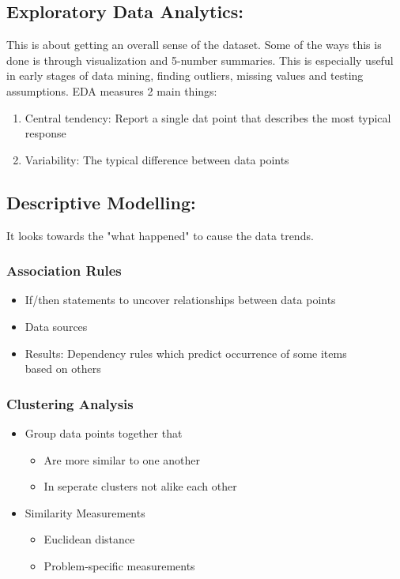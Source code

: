 \documentclass[a5paper]{article}
\begin{document}
	\subsection{Exploratory Data Analytics:}
	This is about getting an overall sense of the dataset. Some of the ways this is done is through visualization and 5-number summaries. This is especially useful in early stages of data mining, finding outliers, missing values and testing assumptions. EDA measures 2 main things:
	\begin{enumerate}
		\item Central tendency: Report a single dat point that describes the most typical response
		\item Variability: The typical difference between data points
	\end{enumerate}
	\subsection{Descriptive Modelling:}
	It looks towards the "what happened" to cause the data trends.
	\subsubsection{Association Rules}
	\begin{itemize}
		\item If/then statements to uncover relationships between data points
		\item Data sources
		\item Results: Dependency rules which predict occurrence of some items\\based on others
	\end{itemize}
	\subsubsection{Clustering Analysis}
	\begin{itemize}
		\item Group data points together that
			\begin{itemize}
				\item Are more similar to one another
				\item In seperate clusters not alike each other
			\end{itemize}
		\item Similarity Measurements
			\begin{itemize}
				\item Euclidean distance
				\item Problem-specific measurements
			\end{itemize}
	\end{itemize}
\end{document}
